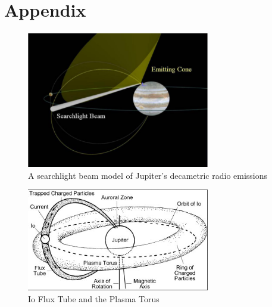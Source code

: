 \documentclass[runningheads,a4paper]{llncs}
\begin{document}
%
\appendix
\chapter*{Appendix}

%
\begin{figure}[here]
\centering
\includegraphics[width=8cm]{images/12}
\caption{A searchlight beam model of Jupiter's decametric radio emissions \citep{imai-08}}
\label{fig:decametric_emissions_searchlight}
\end{figure}
%

%
\begin{figure}[here]
\centering
\includegraphics[width=8cm]{images/13}
\caption{Io Flux Tube and the Plasma Torus \citep{lang-10}}
\label{fig:io_flux_tube_plasma_torus}
\end{figure}
%
\end{document}
